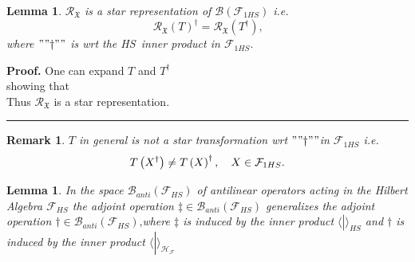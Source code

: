 \documentclass[aps, preprint]{revtex4}
\newtheorem{lemma}[theorem]{Lemma}
\newtheorem{remark}[theorem]{Remark}
\newenvironment{proof}[1][Proof]{\noindent\textbf{#1.} }{\ \rule{0.5em}{0.5em}}
\begin{document}
\begin{lemma}
$\mathcal{R}_{\mathfrak{X}}$ is a star representation of $\mathcal{B} \left (\mathcal{F}_{1 H S}\right )$ i.e.
\begin{equation}\mathcal{R}_{\mathfrak{X}} \left (T\right )^{ \dag } =\mathcal{R}_{\mathfrak{X}} \left (T^{ \dag }\right )\text{,}
\end{equation}where $"" \dag ""$ is wrt the HS\ inner product in $\mathcal{F}_{1 H S}\text{.}$ 
\end{lemma}


\begin{proof}
One can expand $T$ and $T^{ \dag }$
\begin{equation*}
\end{equation*}showing that
\begin{equation*}
\end{equation*}Thus $\mathcal{R}_{\mathfrak{X}}$ is a star representation. 
\end{proof}


\begin{remark}
$T$ in general is not a star transformation wrt $"" \dag ""$in $\mathcal{F}_{1 H S}$ i.e.
\begin{equation}T \left (X^{ \dag }\right ) \neq T \left (X\right )^{ \dag } ,\text{\quad }X \in \mathcal{F}_{1 H S}\text{.}
\end{equation}
\end{remark}


\begin{lemma}
In the space $\mathcal{B}_{a n t i} \left (\mathcal{F}_{H S}\right )$ of antilinear operators acting in the Hilbert Algebra $\mathcal{F}_{H S}$ the adjoint operation $ \ddag  \in \mathcal{B}_{a n t i} \left (\mathcal{F}_{H S}\right )$ generalizes the adjoint operation $ \dag  \in \mathcal{B}_{a n t i} \left (\mathcal{F}_{H S}\right )\text{,}$where $ \ddag $ is induced by the inner product $ \langle \left .\text{}\right \vert  \rangle _{H S}$ and $ \dag $ is induced by the inner product $ \langle \left .\text{}\right \vert  \rangle _{\mathcal{H}_{\mathcal{F}}}$ 
\end{lemma}
\end{document}
